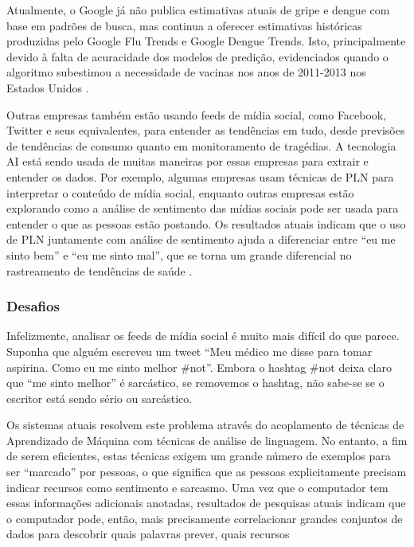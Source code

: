 \documentclass[
	12pt,				%
	openright,			%
	oneside,			%
	a4paper,			%
	english,			%
	spanish,			%
	brazil				%
	]{abntex2}
\begin{document}
Atualmente, o Google já não publica estimativas atuais de gripe e dengue com base em padrões de busca, mas continua a oferecer estimativas históricas produzidas pelo Google Flu Trends e Google Dengue Trends. Isto, principalmente devido à falta de acuracidade dos modelos de predição, evidenciados quando o algoritmo subestimou a necessidade de vacinas nos anos de 2011-2013 nos Estados Unidos  \cite{article_google_flu}.

Outras empresas também estão usando feeds de mídia social, como Facebook, Twitter e seus equivalentes, para entender as tendências em tudo, desde previsões de tendências de consumo quanto em monitoramento de tragédias. A tecnologia AI está sendo usada de muitas maneiras por essas empresas para extrair e entender os dados. Por exemplo, algumas empresas usam técnicas de PLN para interpretar o conteúdo de mídia social, enquanto outras empresas estão explorando como a análise de sentimento das mídias sociais pode ser usada para entender o que as pessoas estão postando. Os resultados atuais indicam que o uso de PLN juntamente com análise de sentimento ajuda a diferenciar entre ``eu me sinto bem'' e ``eu me sinto mal'', que se torna um grande diferencial no rastreamento de tendências de saúde \cite{book_social_machines}.
	
	\subsubsection*{Desafios}
Infelizmente, analisar os feeds de mídia social é muito mais difícil do que parece. Suponha que alguém escreveu um tweet ``Meu médico me disse para tomar aspirina. Como eu me sinto melhor \#not''. Embora o hashtag \#not deixa claro que ``me sinto melhor'' é sarcástico, se removemos o hashtag, não sabe-se se o escritor está sendo sério ou sarcástico.

Os sistemas atuais resolvem este problema através do acoplamento de técnicas de Aprendizado de Máquina com técnicas de análise de linguagem. No entanto, a fim de serem eficientes, estas técnicas exigem um grande número de exemplos para ser ``marcado'' por pessoas, o que significa que as pessoas explicitamente precisam indicar recursos como sentimento e sarcasmo. Uma vez que o computador tem essas informações adicionais anotadas, resultados de pesquisas atuais indicam que o computador pode, então, mais precisamente correlacionar grandes conjuntos de dados para descobrir quais palavras prever, quais recursos %
\end{document}
